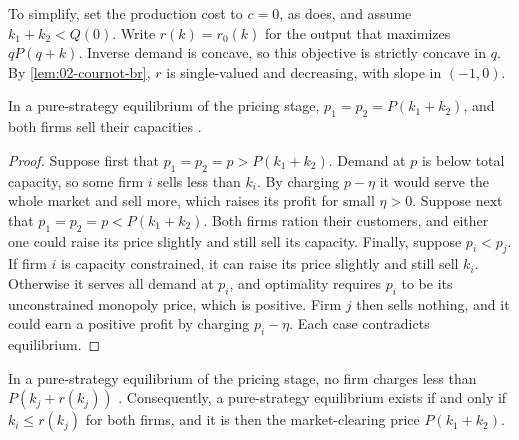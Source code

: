  To simplify, set the production cost to $c = 0$, as \citet[sec.~5.7.2.1]{Tirole1988}
does, and assume $k_1 + k_2 < Q(0)$. Write $r(k) = r_0(k)$ for the output that maximizes $qP(q + k)$. Inverse demand
is concave, so this objective is strictly concave in $q$. By \cref{lem:02-cournot-br}, $r$ is single-valued and
decreasing, with slope in $(-1, 0)$.

\begin{lemma}\label{lem:02-ks1}
In a pure-strategy equilibrium of the pricing stage, $p_1 = p_2 = P(k_1 + k_2)$, and both firms sell their
capacities \citep[sec.~5.7.2.1, Lemma~1]{Tirole1988}.
\end{lemma}

\begin{proof}
Suppose first that $p_1 = p_2 = p > P(k_1 + k_2)$. Demand at $p$ is below total capacity, so some firm $i$ sells less
than $k_i$. By charging $p - \eta$ it would serve the whole market and sell more, which raises its profit for small
$\eta > 0$. Suppose next that $p_1 = p_2 = p < P(k_1 + k_2)$. Both firms ration their customers, and either one could
raise its price slightly and still sell its capacity. Finally, suppose $p_i < p_j$. If firm $i$ is capacity
constrained, it can raise its price slightly and still sell $k_i$. Otherwise it serves all demand at $p_i$, and
optimality requires $p_i$ to be its unconstrained monopoly price, which is positive. Firm $j$ then sells nothing, and
it could earn a positive profit by charging $p_i - \eta$. Each case contradicts equilibrium.
\end{proof}

\begin{lemma}\label{lem:02-ks2}
In a pure-strategy equilibrium of the pricing stage, no firm charges less than $P(k_j + r(k_j))$
\citep[sec.~5.7.2.1, Lemma~2]{Tirole1988}. Consequently, a pure-strategy equilibrium exists if and only if
$k_i \le r(k_j)$ for both firms, and it is then the market-clearing price $P(k_1 + k_2)$.
\end{lemma}

